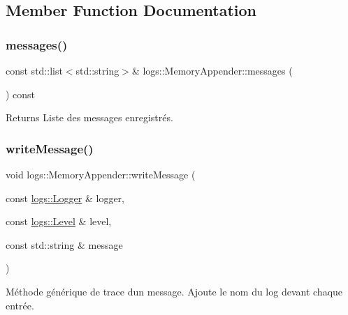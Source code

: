 \subsection{Member Function Documentation}
\mbox{\label{classlogs_1_1MemoryAppender_a04b4a02cf45fa2f60306f1805d464418}} 
\subsubsection{\texorpdfstring{messages()}{messages()}}
{\footnotesize\ttfamily const std\+::list$<$std\+::string$>$\& logs\+::\+Memory\+Appender\+::messages (\begin{DoxyParamCaption}{ }\end{DoxyParamCaption}) const\hspace{0.3cm}{\ttfamily [inline]}}

\begin{DoxyReturn}{Returns}
Liste des messages enregistrés. 
\end{DoxyReturn}
\mbox{\label{classlogs_1_1MemoryAppender_a478c866b07f63f1f89c347b4465834bc}} 
\subsubsection{\texorpdfstring{write\+Message()}{writeMessage()}}
{\footnotesize\ttfamily void logs\+::\+Memory\+Appender\+::write\+Message (\begin{DoxyParamCaption}\item[{const \hyperlink{classlogs_1_1Logger}{logs\+::\+Logger} \&}]{logger,  }\item[{const \hyperlink{classlogs_1_1Level}{logs\+::\+Level} \&}]{level,  }\item[{const std\+::string \&}]{message }\end{DoxyParamCaption})\hspace{0.3cm}{\ttfamily [virtual]}}



Méthode générique de trace d\textquotesingle{}un message. Ajoute le nom du log devant chaque entrée. 


